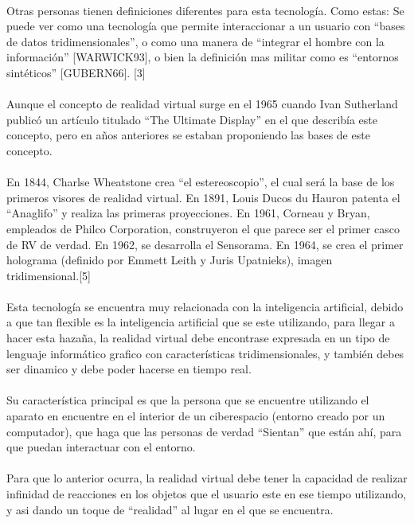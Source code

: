 \documentclass{bmcart}
\begin{document}
\paragraph{}
Otras personas tienen definiciones diferentes para esta tecnología. Como estas: Se puede ver como una tecnología que permite interaccionar a un usuario con “bases de datos tridimensionales”, o como una manera de “integrar el hombre con la información” [WARWICK93], o bien la definición mas militar como es “entornos sintéticos” [GUBERN66]. [3]
\paragraph{}
Aunque el concepto de realidad virtual surge en el 1965 cuando Ivan Sutherland publicó un artículo titulado “The Ultimate Display” en el que describía este concepto, pero en años anteriores se estaban  proponiendo las bases de este concepto.
\paragraph{}
En 1844, Charlse Wheatstone crea “el estereoscopio”, el cual será la base de los primeros visores de realidad virtual.
En 1891, Louis Ducos du Hauron patenta el “Anaglifo” y realiza las primeras proyecciones.
En 1961, Corneau y Bryan, empleados de Philco Corporation, construyeron el que parece ser el primer casco de RV de verdad.
En 1962, se desarrolla el Sensorama.
En 1964, se crea el primer holograma (definido por Emmett Leith y Juris Upatnieks), imagen tridimensional.[5]
\paragraph{}
Esta tecnología se encuentra muy relacionada con la inteligencia artificial, debido a que tan flexible es la inteligencia artificial que se este utilizando, para llegar a hacer esta hazaña, la realidad virtual debe encontrase expresada en un tipo de lenguaje informático grafico con características tridimensionales, y también debes ser dinamico y debe poder hacerse en tiempo real.
\paragraph{}
Su característica principal es que la persona que se encuentre utilizando el aparato en encuentre en el interior de un ciberespacio (entorno creado por un computador), que haga que las personas de verdad “Sientan”  que están ahí, para que puedan interactuar con el entorno.
\paragraph{}
Para que lo anterior ocurra, la realidad virtual debe tener la capacidad de realizar infinidad de reacciones en los objetos que el usuario este en ese tiempo utilizando, y asi dando un toque de “realidad” al lugar en el que se encuentra.
\end{document}
